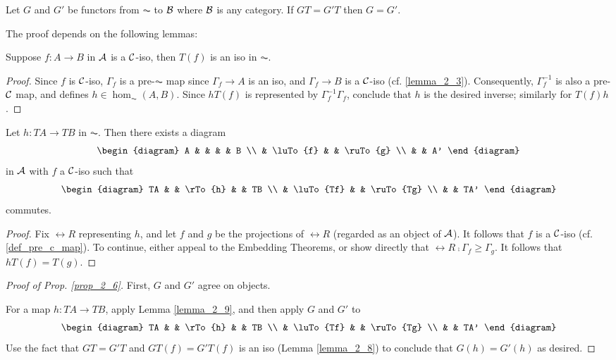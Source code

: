 \begin{prop}\label{prop_2_6}
Let $G$ and $G'$ be functors from $\AC$ to $\mathcal{B}$ where 
$\mathcal{B}$ is any category. If $GT = G'T$ then $G = G'$.
\end{prop}

The proof depends on the following lemmas:

\begin{lem}\label{lemma_2_8}
Suppose $f: A \to B$ in $\mathcal{A}$ is a $\mathcal{C}$-iso,
then $T(f)$ is an iso in $\AC$.
\end{lem}
\begin{proof}
Since $f$ is $\mathcal{C}$-iso, $\Gamma_f$ is a pre-$\AC$ map since 
$\Gamma_f \to A$ is an iso, and $\Gamma_f \to B$ is a 
$\mathcal{C}$-iso (cf. \ref{lemma_2_3}). Consequently, 
$\Gamma_f^{-1}$ is also a pre-$\mathcal{C}$ map, and defines $h \in 
\hom_{\AC}(A,B)$. Since $hT(f)$ is represented by 
$\Gamma_f^{-1}\Gamma_f$, conclude that $h$ is the desired 
inverse; similarly for $T(f)h$.
\end{proof}

\begin{lem}\label{lemma_2_9}
Let $h: TA \to TB$ in $\AC$. Then there exists a diagram
\[
\begin{diagram}
A &          &    &          & B \\
  & \luTo{f} &    & \ruTo{g} \\
  &          & A'
\end{diagram}
\]
in $\mathcal{A}$ with $f$ a $\mathcal{C}$-iso such that
\[
\begin{diagram}
TA &           & \rTo{h} &           & TB \\
   & \luTo{Tf} &         & \ruTo{Tg} \\
   &           & TA'
\end{diagram}
\]
commutes.
\end{lem}

\begin{proof}
Fix $\rel{R}$ representing $h$, and let $f$ and $g$ be the 
projections of $\rel{R}$ (regarded as an object of $\mathcal{A}$). It 
follows that $f$ is a $\mathcal{C}$-iso (cf. \ref{def_pre_c_map}). To 
continue, either appeal to the Embedding Theorems, or show 
directly that $\rel{R}\comp\Gamma_f \geq \Gamma_g$. It follows 
that $hT(f) = T(g)$.
\end{proof}

\begin{proof}[Proof of Prop. \ref{prop_2_6}]
First, $G$ and $G'$ agree on objects.

For a map $h: TA \to TB$, apply Lemma \ref{lemma_2_9}, and then
apply $G$ and $G'$ to
\[
\begin{diagram}
TA &           & \rTo{h} &           & TB \\
   & \luTo{Tf} &         & \ruTo{Tg} \\
   &           & TA'
\end{diagram}
\]
Use the fact that $GT = G'T$ and $GT(f) = G'T(f)$ is an iso (Lemma
\ref{lemma_2_8}) to conclude that $G(h) = G'(h)$ as desired.
\end{proof}

